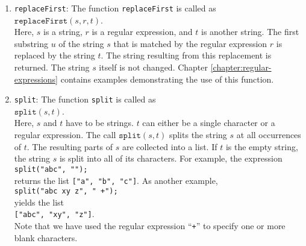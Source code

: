 \begin{enumerate}
\item \texttt{replaceFirst}: The function \texttt{replaceFirst} is called as
      \\[0.2cm]
      \hspace*{1.3cm}
      $\mathtt{replaceFirst}(s, r, t)$.
      \\[0.2cm]
      Here, $s$ is a string, $r$ is a regular expression, and $t$ is another string.
      The first substring $u$ of the string $s$ that is matched by the regular expression $r$ is
      replaced by the string $t$.  The string resulting from this replacement is returned.
      The string $s$ itself is not changed.
      Chapter \ref{chapter:regular-expressions} contains examples demonstrating the use of this function.

\item \texttt{split}: The function \texttt{split} is called as
      \\[0.2cm]
      \hspace*{1.3cm}
      $\texttt{split}(s,t)$.
      \\[0.2cm]
      Here, $s$ and $t$ have to be strings.  $t$ can either be a single character or 
      a regular expression. The call $\mathtt{split}(s, t)$ splits the string $s$ at all
      occurrences of $t$.  The resulting parts of $s$ are collected into a list.
      If $t$ is the empty string, the string $s$ is split into all of its characters.
      For example, the expression
      \\[0.2cm]
      \hspace*{1.3cm}
      \texttt{split("abc", "");}
      \\[0.2cm]
      returns the list \texttt{["a", "b", "c"]}.  As another example,
      \\[0.2cm]
      \hspace*{1.3cm}
      \texttt{split("abc  xy z", " +");}
      \\[0.2cm]
      yields the list
      \\[0.2cm]
      \hspace*{1.3cm}
      \texttt{["abc", "xy", "z"]}.
      \\[0.2cm]
      Note that we have used the regular expression ``\texttt{+}'' to specify one or more
      blank characters.


\end{enumerate}

